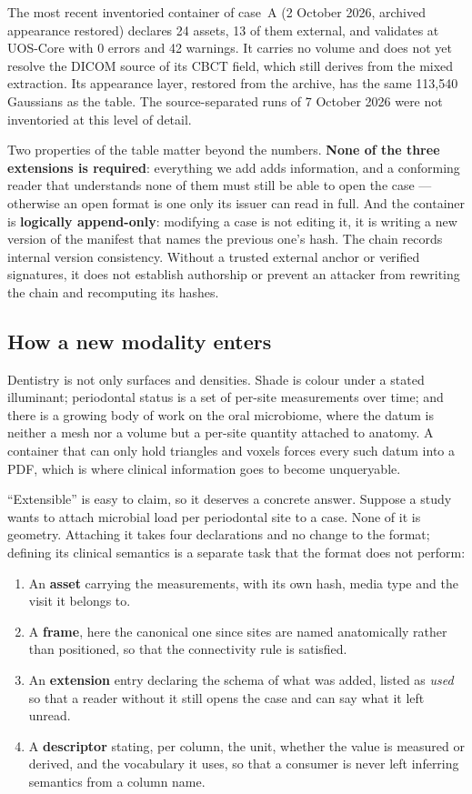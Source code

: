 \documentclass[11pt,a4paper]{article}
\begin{document}
The most recent inventoried container of case~A (2 October 2026, archived appearance
restored) declares 24 assets, 13 of them external, and validates at UOS-Core with 0 errors
and 42 warnings. It carries no volume and does not yet resolve the DICOM source of its CBCT
field, which still derives from the mixed extraction. Its appearance layer, restored from the
archive, has the same 113{,}540 Gaussians as the table. The source-separated runs of
7 October 2026 were not inventoried at this level of detail.

Two properties of the table matter beyond the numbers. \textbf{None of the three extensions is
required}: everything we add adds information, and a conforming reader that understands none
of them must still be able to open the case --- otherwise an open format is one only its
issuer can read in full. And the container is \textbf{logically append-only}: modifying a
case is not editing it, it is writing a new version of the manifest that names the previous
one's hash. The chain records internal version consistency. Without a trusted external anchor or
verified signatures, it does not establish authorship or prevent an attacker from rewriting
the chain and recomputing its hashes.

\subsection{How a new modality enters}\label{sec:newmodality}

Dentistry is not only surfaces and densities. Shade is colour under a stated illuminant;
periodontal status is a set of per-site measurements over time; and there is a growing body
of work on the oral microbiome, where the datum is neither a mesh nor a volume but a
per-site quantity attached to anatomy. A container that can only hold triangles and voxels
forces every such datum into a PDF, which is where clinical information goes to become
unqueryable.

``Extensible'' is easy to claim, so it deserves a concrete answer. Suppose a study wants to
attach microbial load per periodontal site to a case. None of it is geometry. Attaching it
takes four declarations and no change to the format; defining its clinical semantics is a
separate task that the format does not perform:

\begin{enumerate}
  \item An \textbf{asset} carrying the measurements, with its own hash, media type and the
  visit it belongs to.
  \item A \textbf{frame}, here the canonical one since sites are named anatomically
  rather than positioned, so that the connectivity rule is satisfied.
  \item An \textbf{extension} entry declaring the schema of what was added, listed as
  \emph{used} so that a reader without it still opens the case and can say
  what it left unread.
  \item A \textbf{descriptor} stating, per column, the unit, whether the value is measured
  or derived, and the vocabulary it uses, so that a consumer is never left inferring
  semantics from a column name.
\end{enumerate}
\end{document}
